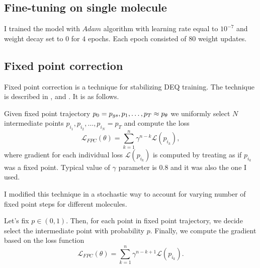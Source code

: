 \documentclass[a4paper,10pt]{report}
\begin{document}
\subsection{Fine-tuning on single molecule}
I trained the model with $Adam$ algorithm with learning rate equal to $10^{-7}$ and weight decay set to $0$ for $4$ epochs. Each epoch consisted of $80$ weight updates.
%

\subsection{Fixed point correction}\label{sec:fpc}
Fixed point correction is a technique for stabilizing DEQ training. The technique is described in \cite{opticalflow}, \cite{geng2023torchdeq}
and \cite{burger2025dequify}. It is as follows.

Given fixed point trajectory $p_0= p_{gs}, p_1,\ldots, p_T\approx  p_\theta $ we uniformly select $N$ intermediate points $p_{i_1}, p_{i_2}, \ldots , p_{i_N}=p_T$ and compute the loss
\begin{equation}
 \mathcal{L}_{FPC}(\theta) = \sum_{k=1}^{n}\gamma^{n-k}\mathcal{L}(p_{i_k}),
\end{equation}
where gradient for each individual loss $\mathcal{L}(p_{i_k})$ is computed by treating as if $p_{i_k}$ was a fixed point. Typical value of $\gamma$ parameter is $0.8$ and it was also the one I used.
\par
I modified this technique in a stochastic way to account for varying number of fixed point steps for different molecules.

Let's fix $p\in (0,1)$. Then, for each point in fixed point trajectory, we decide select the intermediate point with probability $p$.
Finally, we compute the gradient based on the loss function
\begin{equation}
 \mathcal{L}_{FPC}(\theta) = \sum_{k=1}^{n}\gamma^{n-k+1}\mathcal{L}(p_{i_k}).
\end{equation}
\end{document}
